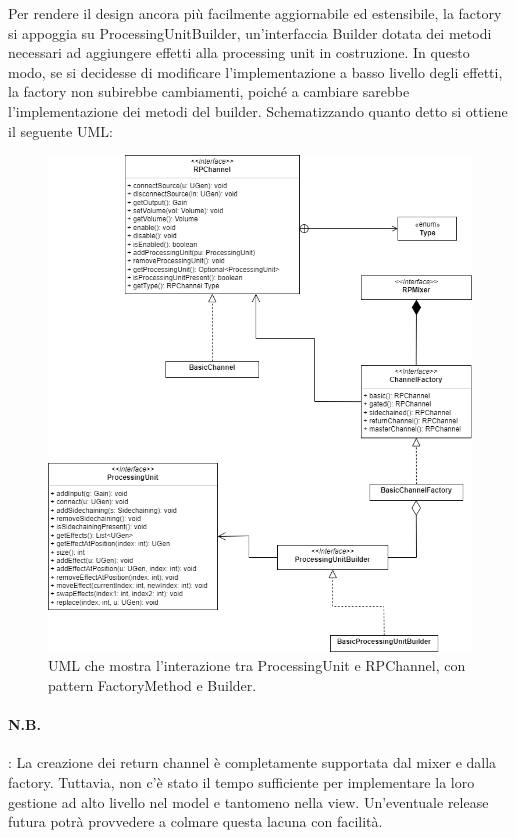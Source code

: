 \documentclass[a4paper,12pt]{report}
\begin{document}
Per rendere il design ancora più facilmente aggiornabile ed estensibile, la factory si appoggia su ProcessingUnitBuilder, un’interfaccia Builder dotata dei metodi necessari ad aggiungere effetti alla processing unit in costruzione. In questo modo, se si decidesse di modificare l’implementazione a basso livello degli effetti, la factory non subirebbe cambiamenti, poiché a cambiare sarebbe l’implementazione dei metodi del builder.
Schematizzando quanto detto si ottiene il seguente UML:

\begin{figure}[H]
\centering{}
\includegraphics[width=\textwidth]{img/processingUnit.png}
\caption{UML che mostra l'interazione tra ProcessingUnit e RPChannel, con pattern FactoryMethod e Builder.}
\end{figure}

\paragraph{N.B.}: La creazione dei return channel è completamente supportata dal mixer e dalla factory. Tuttavia, non c’è stato il tempo sufficiente per implementare la loro 
gestione ad alto livello nel model e tantomeno nella view. Un’eventuale release futura potrà provvedere a colmare questa lacuna con facilità.
\end{document}

